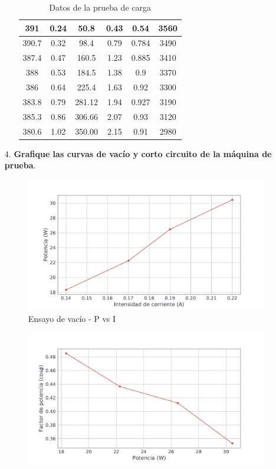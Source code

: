 \documentclass[a4paper,12pt]{article}
\begin{document}
\begin{enumerate}
\begin{itemize}
\begin{table}[H]
{\begin{tabular}{c|c|c|c|c|c}
                \hline
                391 & 0.24 & 50.8 & 0.43 & 0.54 & 3560\\
                \hline
                390.7 & 0.32 & 98.4 & 0.79 & 0.784 & 3490\\
                \hline
                387.4 & 0.47 & 160.5 & 1.23 & 0.885 & 3410\\
                \hline
                388 & 0.53 & 184.5 & 1.38 & 0.9 & 3370\\
                \hline
                386 & 0.64 & 225.4 & 1.63 & 0.92 & 3300\\
                \hline
                383.8 & 0.79 & 281.12 & 1.94 & 0.927 & 3190\\
                \hline
                385.3 & 0.86 & 306.66 & 2.07 & 0.93 & 3120\\
                \hline
                380.6 & 1.02 & 350.00 & 2.15 & 0.91 & 2980
            \end{tabular}}
            \caption{Datos de la prueba de carga}
        \end{table}
    \end{itemize}
    \item[4.] \textbf{Grafique las curvas de vacío y corto circuito de la máquina de prueba}.
    \begin{figure}[H]
        \centering
        \includegraphics[scale = 0.85]{vacio1.pdf}
        \caption{Ensayo de vacío - P vs I}
    \end{figure}
    \begin{figure}[H]
        \centering
        \includegraphics[scale = 0.85]{vacio2.pdf}

\end{figure}
\end{enumerate}
\end{document}
